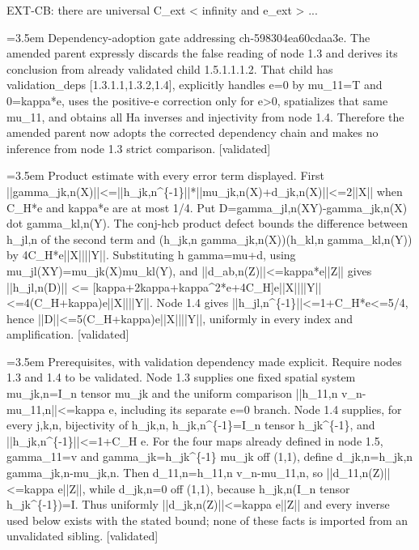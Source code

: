 \documentclass{article}
\newcommand{\step}[1]{\par\noindent\hangindent=3.5em\hangafter=1%
  \makebox[3.5em][l]{\textbf{#1.}}}
\newcommand{\steptag}[1]{\hfill{\small\textsf{[#1]}}}
\begin{document}
\begin{proofbox}{EXT-CB: there are universal C\_ext < infinity and e\_ext > ...}
\step{1.5.1.1.1.3} Dependency-adoption gate addressing ch-598304ea60cdaa3e. The amended parent expressly discards the false reading of node 1.3 and derives its conclusion from already validated child 1.5.1.1.1.2. That child has validation\_deps [1.3.1.1,1.3.2,1.4], explicitly handles e=0 by mu\_11=T and 0=kappa*e, uses the positive-e correction only for e>0, spatializes that same mu\_11, and obtains all Ha inverses and injectivity from node 1.4. Therefore the amended parent now adopts the corrected dependency chain and makes no inference from node 1.3 strict comparison. \steptag{validated} \\[4pt]
\step{1.5.2} Product estimate with every error term displayed. First ||gamma\_jk,n(X)||<=||h\_jk,n\textasciicircum{}\{-1\}||*||mu\_jk,n(X)+d\_jk,n(X)||<=2||X|| when C\_H*e and kappa*e are at most 1/4. Put D=gamma\_jl,n(XY)-gamma\_jk,n(X) dot gamma\_kl,n(Y). The conj-hcb product defect bounds the difference between h\_jl,n of the second term and (h\_jk,n gamma\_jk,n(X))(h\_kl,n gamma\_kl,n(Y)) by 4C\_H*e||X||||Y||. Substituting h gamma=mu+d, using mu\_jl(XY)=mu\_jk(X)mu\_kl(Y), and ||d\_ab,n(Z)||<=kappa*e||Z|| gives ||h\_jl,n(D)|| <= [kappa+2kappa+kappa\textasciicircum{}2*e+4C\_H]e||X||||Y|| <=4(C\_H+kappa)e||X||||Y||. Node 1.4 gives ||h\_jl,n\textasciicircum{}\{-1\}||<=1+C\_H*e<=5/4, hence ||D||<=5(C\_H+kappa)e||X||||Y||, uniformly in every index and amplification. \steptag{validated} \\[6pt]
\step{1.5.2.1} Prerequisites, with validation dependency made explicit. Require nodes 1.3 and 1.4 to be validated. Node 1.3 supplies one fixed spatial system mu\_jk,n=I\_n tensor mu\_jk and the uniform comparison ||h\_11,n v\_n-mu\_11,n||<=kappa e, including its separate e=0 branch. Node 1.4 supplies, for every j,k,n, bijectivity of h\_jk,n, h\_jk,n\textasciicircum{}\{-1\}=I\_n tensor h\_jk\textasciicircum{}\{-1\}, and ||h\_jk,n\textasciicircum{}\{-1\}||<=1+C\_H e. For the four maps already defined in node 1.5, gamma\_11=v and gamma\_jk=h\_jk\textasciicircum{}\{-1\} mu\_jk off (1,1), define d\_jk,n=h\_jk,n gamma\_jk,n-mu\_jk,n. Then d\_11,n=h\_11,n v\_n-mu\_11,n, so ||d\_11,n(Z)||<=kappa e||Z||, while d\_jk,n=0 off (1,1), because h\_jk,n(I\_n tensor h\_jk\textasciicircum{}\{-1\})=I. Thus uniformly ||d\_jk,n(Z)||<=kappa e||Z|| and every inverse used below exists with the stated bound; none of these facts is imported from an unvalidated sibling. \steptag{validated} \\[6pt]

\end{proofbox}
\end{document}

